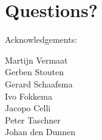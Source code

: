 \documentclass[slidestop]{beamer}
\begin{document}
\section{Questions?}
\lastpagetemplate
\begin{frame}
  \begin{center}
    Acknowledgements:
    \bigskip
    \bigskip

    Martijn Vermaat\\
    Gerben Stouten\\
    Gerard Schaafsma\\
    Ivo Fokkema\\
    Jacopo Celli\\
    Peter Taschner\\
    Johan den Dunnen
    \bigskip
    \bigskip
    \bigskip
    \bigskip
    \bigskip
    \bigskip
    \bigskip

  \end{center}
\end{frame}
\end{document}
